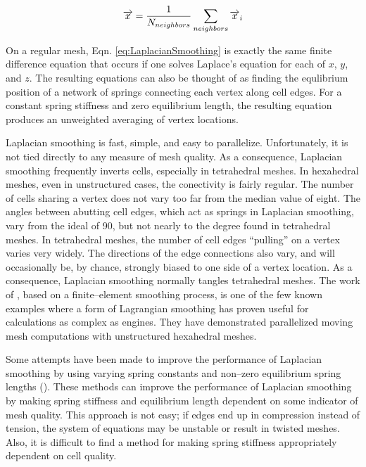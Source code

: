 \documentclass[a4paper,12pt,notitlepage]{article}
\begin{document}
\begin{equation}
  \label{eq:LaplacianSmoothing}
  \overrightarrow{x} ={1 \over N_{neighbors}} \sum_{neighbors} \overrightarrow{x} _{i}
\end{equation} 

On a regular mesh, Eqn. \ref{eq:LaplacianSmoothing} is exactly the
same finite difference equation that occurs if one solves Laplace's
equation for each of $x$, $y$, and $z$.  The resulting equations can
also be thought of as finding the equlibrium position of a network of
springs connecting each vertex along cell edges.  For a constant
spring stiffness and zero equilibrium length, the resulting equation
produces an unweighted averaging of vertex locations.

Laplacian smoothing is fast, simple, and easy to parallelize.
Unfortunately, it is not tied directly to any measure of mesh quality.
As a consequence, Laplacian smoothing frequently inverts cells,
especially in tetrahedral meshes.  In hexahedral meshes, even in unstructured cases, the conectivity is fairly regular.  The
number of cells sharing a vertex does not vary too far from the median
value of eight.  The angles between abutting cell edges, which act as
springs in Laplacian smoothing, vary from the ideal of
\unit{90}\degree, but not nearly to the degree found in tetrahedral
meshes.  In tetrahedral meshes, the number of cell edges ``pulling''
on a vertex varies very widely.  The directions of the edge
connections also vary, and will occasionally be, by chance, strongly
biased to one side of a vertex location.  As a consequence, Laplacian
smoothing normally tangles tetrahedral meshes.  The work of
\cite{lucchini:sae2007}, based on a finite--element smoothing
process, is one of the few known examples where a form of Lagrangian
smoothing has proven useful for calculations as complex as engines.  They have demonstrated parallelized moving mesh computations with unstructured hexahedral meshes.

Some attempts have been made to improve the performance of Laplacian
smoothing by using varying spring constants and non--zero equilibrium
spring lengths (\cite{Anderson:JCP2005}).  These methods can improve the performance
of Laplacian smoothing by making spring stiffness and equilibrium
length dependent on some indicator of mesh quality.  This approach is
not easy; if edges end up in compression instead of tension, the
system of equations may be unstable or result in twisted meshes.
Also, it is difficult to find a method for making spring stiffness
appropriately dependent on cell quality.
\end{document}
